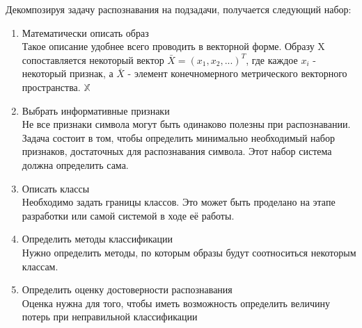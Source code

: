 \documentclass[12pt,a4paper]{article}
\begin{document}
Декомпозируя задачу распознавания на подзадачи, получается следующий набор:
\begin{enumerate}
    \item Математически описать образ \\
        Такое описание удобнее всего проводить в векторной форме. Образу X сопоставляется некоторый вектор $\bar{X}=(x_1, x_2, ...)^T$, где каждое $x_i$ - некоторый признак, а $\bar{X}$ - элемент конечномерного метрического векторного пространства. $\mathbb{X}$
    \item Выбрать информативные признаки \\
        Не все признаки символа могут быть одинаково полезны при распознавании. Задача состоит в том, чтобы определить минимально необходимый набор признаков, достаточных для распознавания символа. Этот набор система должна определить сама.
    \item Описать классы \\
        Необходимо задать границы классов. Это может быть проделано на этапе разработки или самой системой в ходе её работы.
    \item Определить методы классификации \\
        Нужно определить методы, по которым образы будут соотноситься некоторым классам.
    \item Определить оценку достоверности распознавания \\
        Оценка нужна для того, чтобы иметь возможность определить величину потерь при неправильной классификации
\end{enumerate}
\end{document}
